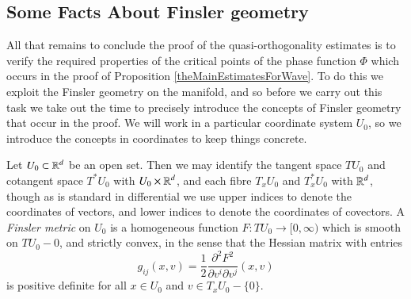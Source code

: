 \subsection{Some Facts About Finsler geometry} \label{BriefIntroduction}

All that remains to conclude the proof of the quasi-orthogonality estimates is to verify the required properties of the critical points of the phase function $\Phi$ which occurs in the proof of Proposition \ref{theMainEstimatesForWave}. To do this we exploit the Finsler geometry on the manifold, and so before we carry out this task we take out the time to precisely introduce the concepts of Finsler geometry that occur in the proof. We will work in a particular coordinate system $U_0$, so we introduce the concepts in coordinates to keep things concrete.


Let $U_0 \subset \operatorname{\mathbb{R}}^d$ be an open set. Then we may identify the tangent space $T U_0$ and cotangent space $T^* U_0$ with $U_0 \times \operatorname{\mathbb{R}}^d$, and each fibre $T_x U_0$ and $T^*_x U_0$ with $\operatorname{\mathbb{R}}^d$, though as is standard in differential we use upper indices to denote the coordinates of vectors, and lower indices to denote the coordinates of covectors. A \emph{Finsler metric} on $U_0$ is a homogeneous function $F: T U_0 \to [0,\infty)$ which is smooth on $TU_0 - 0$, and strictly convex, in the sense that the Hessian matrix with entries
%
\begin{equation} \label{FinslerMetricCoefficients}
    g_{ij}(x,v) = \frac{1}{2} \frac{\partial^2 F^2}{\partial v^i \partial v^j}(x,v)
\end{equation}
%
is positive definite for all $x \in U_0$ and $v \in T_x U_0 - \{ 0 \}$.%


